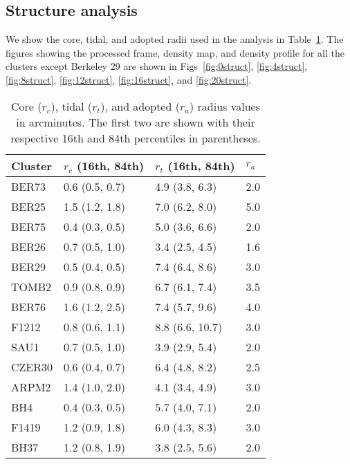 \documentclass{aa}
\begin{document}
\begin{appendix}

\FloatBarrier
\section{Structure analysis}
 \label{app:struct_analysis}

 We show the core, tidal, and adopted radii used in the analysis in
 Table~\ref{tab:radii}. The figures showing the processed frame, density map,
 and density profile for all the clusters except Berkeley 29 are shown in
 Figs~\ref{fig:0struct}, \ref{fig:4struct}, \ref{fig:8struct}, 
 \ref{fig:12struct}, \ref{fig:16struct}, and \ref{fig:20struct}.

 \begin{table}[h!]
 \caption{Core ($r_{c}$), tidal ($r_{t}$), and adopted ($r_{a}$) radius values
 in arcminutes. The first two are shown with their respective 16th and 84th
 percentiles in parentheses.}
 \label{tab:radii}
 \centering
 \begin{tabular}{llll}
 \hline\hline
 Cluster & $r_{c}$ (16th, 84th) &  $r_{t}$ (16th, 84th) & $r_{a}$\\
 \hline
  BER73         & 0.6 (0.5, 0.7) &  4.9 (3.8, 6.3) &  2.0\\
  BER25         & 1.5 (1.2, 1.8) &  7.0 (6.2, 8.0) &  5.0\\
  BER75         & 0.4 (0.3, 0.5) &  5.0 (3.6, 6.6) &  2.0\\
  BER26         & 0.7 (0.5, 1.0) &  3.4 (2.5, 4.5) &  1.6\\
  BER29         & 0.5 (0.4, 0.5) &  7.4 (6.4, 8.6) &  3.0\\
  TOMB2         & 0.9 (0.8, 0.9) &  6.7 (6.1, 7.4) &  3.5\\
  BER76         & 1.6 (1.2, 2.5) &  7.4 (5.7, 9.6) &  4.0\\
  F1212         & 0.8 (0.6, 1.1) &  8.8 (6.6, 10.7) & 3.0\\
  SAU1          & 0.7 (0.5, 1.0) &  3.9 (2.9, 5.4) &  2.0\\
  CZER30        & 0.6 (0.4, 0.7) &  6.4 (4.8, 8.2) &  2.5\\
  ARPM2         & 1.4 (1.0, 2.0) &  4.1 (3.4, 4.9) &  3.0\\
  BH4           & 0.4 (0.3, 0.5) &  5.7 (4.0, 7.1) &  2.0\\
  F1419         & 1.2 (0.9, 1.8) &  6.0 (4.3, 8.3) &  3.0\\
  BH37          & 1.2 (0.8, 1.9) &  3.8 (2.5, 5.6) &  2.0\\

\end{tabular}
\end{table}
\end{appendix}
\end{document}
